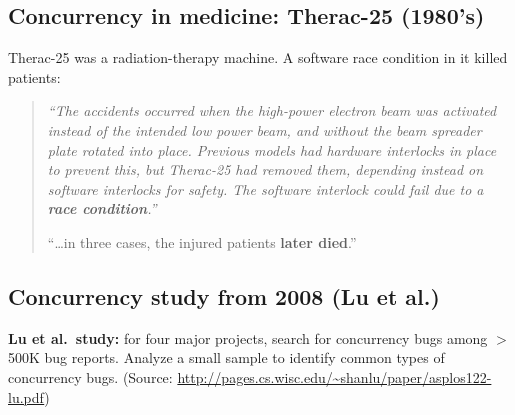 \documentclass[11pt,a4paper]{article}
\begin{document}
\subsection{Concurrency in medicine: Therac-25 (1980's)}

Therac-25 was a radiation-therapy machine. A software race condition in it
killed patients:

\begin{quote}
\itshape ``The accidents occurred when the high-power electron beam was
activated instead of the intended low power beam, and without the beam
spreader plate rotated into place. Previous models had hardware interlocks in
place to prevent this, but Therac-25 had removed them, depending instead on
software interlocks for safety. The software interlock could fail due to a
\textbf{race condition}.''

``\ldots in three cases, the injured patients \textbf{later died}.''
\end{quote}

\subsection{Concurrency study from 2008 (Lu et al.)}

\textbf{Lu et al.\ study:} for four major projects, search for concurrency
bugs among \(>\)500K bug reports. Analyze a small sample to identify common
types of concurrency bugs.
{\small (Source: \url{http://pages.cs.wisc.edu/~shanlu/paper/asplos122-lu.pdf})}

\begin{center}
\end{center}
\end{document}
